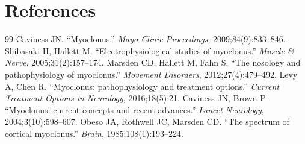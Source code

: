 \section*{References}
\begin{thebibliography}{99}
 Caviness JN. ``Myoclonus.'' \textit{Mayo Clinic Proceedings}, 2009;84(9):833--846.
 Shibasaki H, Hallett M. ``Electrophysiological studies of myoclonus.'' \textit{Muscle \& Nerve}, 2005;31(2):157--174.
 Marsden CD, Hallett M, Fahn S. ``The nosology and pathophysiology of myoclonus.'' \textit{Movement Disorders}, 2012;27(4):479--492.
 Levy A, Chen R. ``Myoclonus: pathophysiology and treatment options.'' \textit{Current Treatment Options in Neurology}, 2016;18(5):21.
 Caviness JN, Brown P. ``Myoclonus: current concepts and recent advances.'' \textit{Lancet Neurology}, 2004;3(10):598--607.
 Obeso JA, Rothwell JC, Marsden CD. ``The spectrum of cortical myoclonus.'' \textit{Brain}, 1985;108(1):193--224.

\end{thebibliography}
